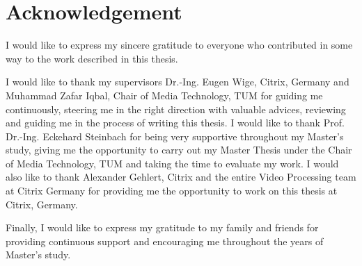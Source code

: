 
\thispagestyle{plain}

\section*{Acknowledgement}

I would like to express my sincere gratitude to everyone who contributed in some way to the work described in this thesis.

I would like to thank my supervisors Dr.-Ing. Eugen Wige, Citrix, Germany and Muhammad Zafar Iqbal, Chair of Media Technology, TUM for guiding me continuously, steering me in the right direction with valuable advices, reviewing and guiding me in the process of writing this thesis. I would like to thank Prof. Dr.-Ing. Eckehard Steinbach for being very supportive throughout my Master's study, giving me the opportunity to carry out my Master Thesis under the Chair of Media Technology, TUM and taking the time to evaluate my work. I would also like to thank Alexander Gehlert, Citrix and the entire Video Processing team at Citrix Germany for providing me the opportunity to work on this thesis at Citrix, Germany.

Finally, I would like to express my gratitude to my family and friends for providing continuous support and encouraging me throughout the years of Master's study.